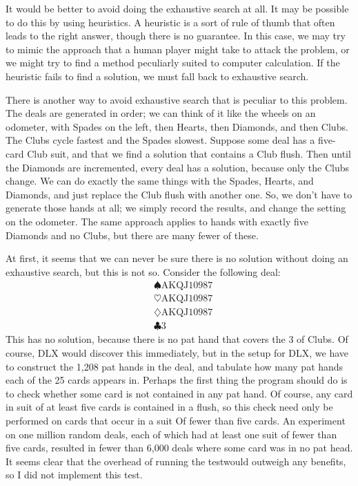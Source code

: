 \documentclass [12pt, letterpaper] {article}
\begin{document}
It would be better to avoid doing the exhaustive search at all.  It may be possible to do this by using heuristics.  A heuristic is a sort of rule of thumb that often leads 
to the right answer, though there is no guarantee.  In this case, we may try to mimic the approach that a human player might take
to attack the problem, or we might try to find a method peculiarly suited to computer calculation.  If the heuristic fails to find 
a solution, we must fall back to exhaustive search.

There is another way to avoid exhaustive search that is peculiar to this problem.  The deals are generated in order; we can
think of it like the wheels on an odometer, with Spades on the left, then Hearts, then Diamonds, and then Clubs.  The Clubs cycle
fastest and the Spades slowest.  Suppose some deal has a five-card Club suit, and that we find a solution that contains a
Club flush.  Then until the Diamonds are incremented, every deal has a solution, because only the Clubs change.  We can do
exactly the same things with the Spades, Hearts, and Diamonds, and just replace the Club flush with another one.  So, we don't
have to generate those hands at all; we simply record the results, and change the setting on the odometer.  The same approach
applies to hands with exactly five Diamonds and no Clubs, but there are many fewer of these.

At first, it seems that we can never be sure there is no 
solution without doing an exhaustive search, but this is not so.  Consider the following deal:
\begin{align*}
    &\spadesuit \text{AKQJ10987} \\
    &\heartsuit \text{AKQJ10987}  \\
    &\diamondsuit \text{AKQJ10987} \\
    &\clubsuit \text{3}
\end{align*}
This has no solution, because there is no pat hand that covers the 3 of Clubs.  Of course, DLX would discover this immediately, but in the 
setup for DLX, we have to construct the 1,208 pat hands in the deal, and tabulate how many pat hands each of the 25 cards
appears in.  Perhaps the first thing the program should do is to check whether some card is not contained in any pat hand.  Of course, any
card in suit of at least five cards is contained in a flush, so this check need only be performed on cards that occur in a suit Of
fewer than five cards.  An experiment on one million random deals, each of which had at least one suit of fewer than five cards,
resulted in fewer than 6,000 deals where some card was in no pat head.  It seems clear that the overhead of running the testwould
outweigh any benefits, so I did not implement this test.
\end{document}
